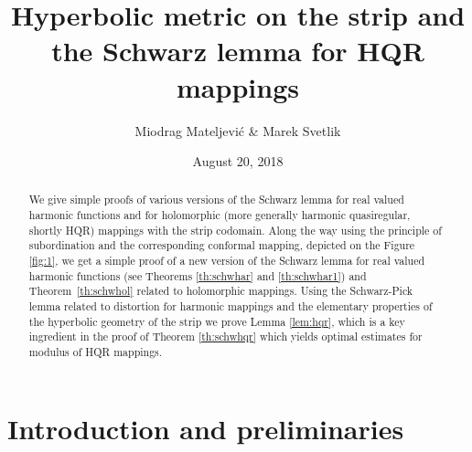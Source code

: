 \documentclass{amsart}
\author{Miodrag Mateljevi\' c  \&  Marek Svetlik}
\title[The Schwarz lemma for HQR mappings]{Hyperbolic metric on the strip and the Schwarz lemma for HQR mappings}
\date{August 20, 2018}
\begin{document}
\maketitle

\begin{abstract}
We give simple proofs of various versions of the Schwarz lemma
for real valued harmonic functions and for holomorphic (more generally harmonic quasi\-re\-gu\-lar, shortly  HQR) mappings
with the strip codomain. Along the way  using the principle of subordination and the corresponding
conformal mapping, depicted  on the Figure \ref{fig:1}, we get a simple
proof of a new  version of the Schwarz lemma for  real valued harmonic functions (see Theorems
\ref{th:schwhar}  and  \ref{th:schwhar1}) and   Theorem~\ref{th:schwhol} related to  holomorphic mappings.
Using  the Schwarz-Pick lemma related to distortion   for harmonic mappings  and the elementary properties of  the hyperbolic
geometry  of the strip we prove Lemma \ref{lem:hqr}, which is a key ingredient  in
the proof of  Theorem  \ref{th:schwhqr}  which  yields  optimal estimates  for modulus of  HQR  mappings.

\end{abstract}

\section{Introduction and preliminaries}

\end{document}
